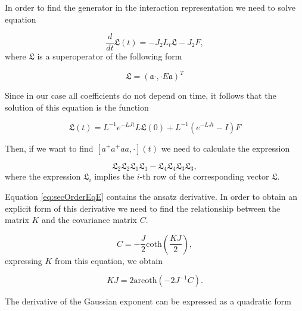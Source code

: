 \documentclass[12pt]{article}
\theoremstyle{definition}
\newcommand{\mf}[1]{\mathfrak{#1}}
\begin{document}
	In order to find the generator in the interaction representation we need to solve equation
	
	\begin{equation}
		\label{eq:InteractionReprSuper}
		\dfrac{d}{dt}\mathfrak{L}(t) = -J_2L_t\mathfrak{L}-J_2F,
	\end{equation}
	where $\mf{L}$ is a superoperator of the following form
	
	\begin{equation*}
		\mathfrak{L} = (\mathfrak{a}\cdot,\cdot E\mathfrak{a})^T
	\end{equation*}
	
	Since in our case all coefficients do not depend on time, it follows that the solution of this equation is the function
	
	\begin{equation}
		\label{eq:SolOfSuper}
		\mathfrak{L}(t) = L^{-1}e^{-LJt}L\mf{L}(0) + L^{-1}(e^{-LJt} - I)F
	\end{equation}
	
	
	Then, if we want to find $[a^+a^+aa,\cdot](t)$ we need to calculate the expression
	
	\begin{equation*}
		\mathfrak{L}_2\mathfrak{L}_2\mathfrak{L}_1\mathfrak{L}_1 - \mathfrak{L}_4\mathfrak{L}_4\mathfrak{L}_3\mathfrak{L}_3,
	\end{equation*}
	where the expression $\mathfrak{L}_i$ implies the $i$-th row of the corresponding vector $\mathfrak{L}$.
	
	
	
	Equation \ref{eq:secOrderEqE} contains the ansatz derivative. In order to obtain an explicit form of this derivative we need to find the relationship between the matrix $K$ and the covariance matrix $C$.
	
	\begin{equation}
		\label{eq:ConOfCFromK}
		C = -\frac{J}{2}\text{coth}\left(\frac{KJ}{2}\right),
	\end{equation}
	expressing $K$ from this equation, we obtain
	
	\begin{equation}
		\label{eq:ConOfKFromC}
		KJ = 2\text{arcoth}\left(-2J^{-1}C\right).		
	\end{equation}
	
	The derivative of the Gaussian exponent can be expressed as a quadratic form
	
\end{document}

